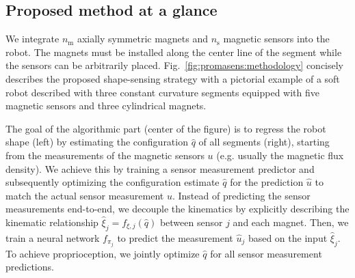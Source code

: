 \subsection{Proposed method at a glance}

We integrate $n_\mathrm{m}$ axially symmetric magnets and $n_\mathrm{s}$ magnetic sensors into the robot. The magnets must be installed along the center line of the segment while the sensors can be arbitrarily placed.
%
%
Fig.~\ref{fig:promasens:methodology} concisely describes the proposed shape-sensing strategy with a pictorial example of a soft robot described with three constant curvature segments equipped with five magnetic sensors and three cylindrical magnets.
%

The goal of the algorithmic part (center of the figure) is to regress the robot shape (left) by estimating the configuration $\hat{q}$ of all segments (right),
starting from the measurements of the magnetic sensors $u$ (e.g. usually the magnetic flux density).
We achieve this by training a sensor measurement predictor and subsequently optimizing the configuration estimate $\hat{q}$ for the prediction $\hat{u}$ to match the actual sensor measurement $u$.
Instead of predicting the sensor measurements end-to-end, we decouple the kinematics by explicitly describing the kinematic relationship $\hat{\xi}_j = f_{\xi,j}(\hat{q})$ between sensor $j$ and each magnet. %
Then, we train a neural network $f_{\pi_j}$ to predict the measurement $\hat{u}_j$ based on the input $\hat{\xi}_j$.
To achieve proprioception, we jointly optimize $\hat{q}$ for all sensor measurement predictions. %


